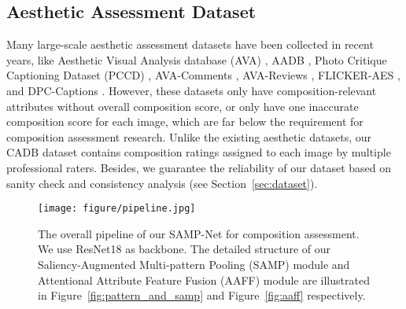 \documentclass{bmvc2k}
\begin{document}
\subsection{Aesthetic Assessment Dataset}
Many large-scale aesthetic assessment datasets have been collected in recent years, like Aesthetic Visual Analysis database (AVA) \cite{Murray2012AVAAL}, AADB \cite{Kong2016PhotoAR}, Photo Critique Captioning Dataset (PCCD) \cite{Chang2017AestheticCG}, AVA-Comments \cite{Zhou2016JointIA}, AVA-Reviews \cite{Wang2019NeuralAI}, FLICKER-AES \cite{Ren2017PersonalizedIA}, and DPC-Captions \cite{Jin2019AestheticAA}.
However, these datasets only have composition-relevant attributes without overall composition score, or only have one inaccurate composition score for each image, which are far below the requirement for composition assessment research.
Unlike the existing aesthetic datasets, our CADB dataset contains composition ratings assigned to each image by multiple professional raters. Besides, we guarantee the reliability of our dataset based on sanity check and consistency analysis (see Section~\ref{sec:dataset}).

\begin{figure*}[tbp]
\begin{center}
   \texttt{[image: figure/pipeline.jpg]}
\end{center}
   \vspace{-5mm}
   \caption{The overall pipeline of our SAMP-Net for composition assessment. We use ResNet18 \cite{he2016deep} as backbone. The detailed structure of our Saliency-Augmented Multi-pattern Pooling (SAMP) module and Attentional Attribute Feature Fusion (AAFF) module are illustrated in Figure~\ref{fig:pattern_and_samp} and Figure~\ref{fig:aaff} respectively.}
  \vspace{-5mm}
\label{fig:pipeline}
\end{figure*}
\end{document}
